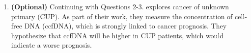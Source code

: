 \documentclass{article}\usepackage[]{graphicx}\usepackage[]{xcolor}
\begin{document}
\begin{enumerate}
\begin{enumerate}
\begin{table}[H]
\begin{tabular}{llcc}
        &    2.4         &                              &            \\\hline
      \end{tabular}
    \end{table}
    \item Redo this simulation. Except, now, generate data from a Gaussian 
    distribution instead of an Exponential distribution. Use $\mu_X=\sigma_X=\lambda$.
    What happens to the results?
  \end{enumerate}
  \item \textbf{(Optional)} Continuing with Questions 2-3. \cite{Pouyiourou23} 
  explores cancer of unknown primary (CUP). As part of their work, they measure 
  the concentration of cell-free DNA (ccfDNA), which is strongly linked to 
  cancer prognosis. They hypothesize that ccfDNA will be higher in CUP patients, 
  which would indicate a worse prognosis.
  

\end{enumerate}
\end{document}
